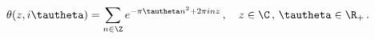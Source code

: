 \begin{equation}
\label{theta}
\theta ( z , i \tautheta ) = \sum_{n \in \Z} 
e^{- \pi \tautheta n^2 + 2 \pi i n z} \, , \quad z \in \C \, , \, 
\tautheta \in \R_+ \, .
\end{equation}

